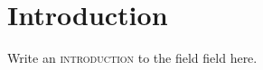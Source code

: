\chapter{Introduction}\noindent
Write an \textsc{introduction} to the field {\prefixFont field} here. 
